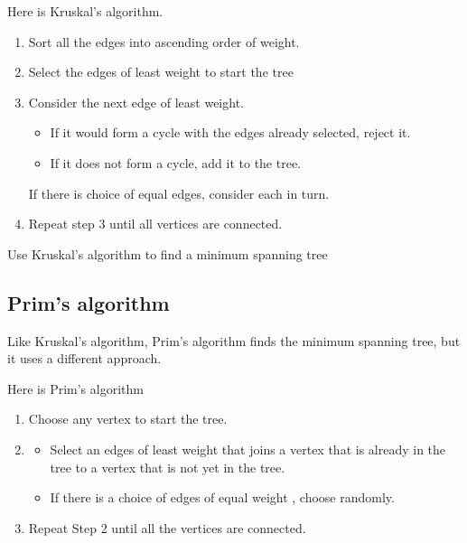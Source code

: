 \documentclass[a4paper]{article}
\begin{document}
\begin{defi}
Here is Kruskal's algorithm.
\begin{enumerate}
\item Sort all the edges into ascending order of weight.
\item Select the edges of least weight to start the tree
\item Consider the next edge of least weight.\begin{itemize}
                                                                       \item If it would form a cycle with the edges already selected, reject it. \item If it does not form a cycle, add it to the tree.
                                                                       \end{itemize}
                                                                       If there is choice of equal edges, consider each in turn.
\item Repeat step 3 until all vertices are connected.
\end{enumerate}

\end{defi}

\begin{eg}
Use Kruskal's algorithm to find a minimum spanning tree
\end{eg}

\begin{eg}

\end{eg}

\subsection{Prim's algorithm}
Like Kruskal's algorithm, Prim's algorithm finds the minimum spanning tree, but it uses a different approach.
\begin{defi}
Here is Prim's algorithm
\begin{enumerate}
\item Choose any vertex to start the tree.
\item \begin{itemize}
         \item Select an edges of least weight that joins a vertex that is already in the tree to a vertex that is not yet in the tree.
         \item If there is a choice of edges of equal weight , choose randomly.
         \end{itemize}
\item Repeat Step 2 until all the vertices are connected.
\end{enumerate}
\end{defi}
\end{document}
